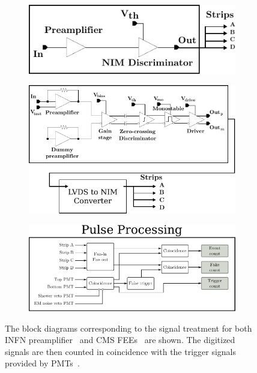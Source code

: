 	\begin{figure}[H]
		\begin{subfigure}{.5\linewidth}
		    \centering
			\includegraphics[width = 0.9\linewidth]{fig/chapt6/atlas-block-diagram-2013.pdf}
			\caption{\label{fig:Pulse-Processing:A}}
		\end{subfigure}
		\begin{subfigure}{.5\linewidth}
		    \centering
			\includegraphics[width = 0.9\linewidth]{fig/chapt6/cms-block-diagram-2013.pdf}
			\caption{\label{fig:Pulse-Processing:B}}
		\end{subfigure}
		\begin{subfigure}{\linewidth}
		    \centering
			\includegraphics[width = 0.8\linewidth]{fig/chapt6/pulse-processing-2013.pdf}
			\caption{\label{fig:Pulse-Processing:C}}
		\end{subfigure}
		\caption{\label{fig:Pulse-Processing} The block diagrams corresponding to the signal treatment for both INFN preamplifier~ and CMS FEEs~ are shown. The digitized signals are then counted in coincidence with the trigger signals provided by PMTs~.}
    \end{figure}
    
